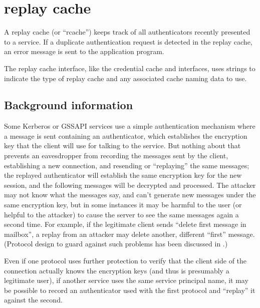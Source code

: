 \documentclass[letterpaper,10pt,english]{sphinxmanual}
\begin{document}
\chapter{replay cache}
\label{\detokenize{basic/rcache_def:replay-cache}}\label{\detokenize{basic/rcache_def:rcache-definition}}\label{\detokenize{basic/rcache_def::doc}}
\sphinxAtStartPar
A replay cache (or “rcache”) keeps track of all authenticators
recently presented to a service.  If a duplicate authentication
request is detected in the replay cache, an error message is sent to
the application program.

\sphinxAtStartPar
The replay cache interface, like the credential cache and
{\hyperref[\detokenize{basic/keytab_def:keytab-definition}]{}} interfaces, uses  strings to
indicate the type of replay cache and any associated cache naming
data to use.


\section{Background information}
\label{\detokenize{basic/rcache_def:background-information}}
\sphinxAtStartPar
Some Kerberos or GSSAPI services use a simple authentication mechanism
where a message is sent containing an authenticator, which establishes
the encryption key that the client will use for talking to the
service.  But nothing about that prevents an eavesdropper from
recording the messages sent by the client, establishing a new
connection, and re\sphinxhyphen{}sending or “replaying” the same messages; the
replayed authenticator will establish the same encryption key for the
new session, and the following messages will be decrypted and
processed.  The attacker may not know what the messages say, and can’t
generate new messages under the same encryption key, but in some
instances it may be harmful to the user (or helpful to the attacker)
to cause the server to see the same messages again a second time.  For
example, if the legitimate client sends “delete first message in
mailbox”, a replay from an attacker may delete another, different
“first” message.  (Protocol design to guard against such problems has
been discussed in .)

\sphinxAtStartPar
Even if one protocol uses further protection to verify that the client
side of the connection actually knows the encryption keys (and thus is
presumably a legitimate user), if another service uses the same
service principal name, it may be possible to record an authenticator
used with the first protocol and “replay” it against the second.
\end{document}

